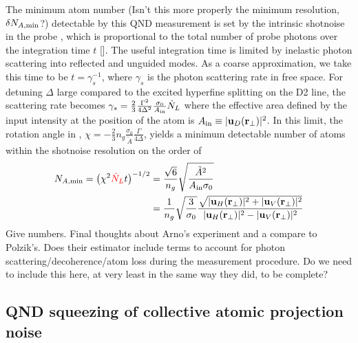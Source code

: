 \documentclass[preprint,aps,pra,onecolumn]{revtex4-1} %
\newcommand{\change}[1]{{\color{RoyalBlue} #1}}
\newcommand{\comment}[1]{{\color{Maroon} #1}}
\newcommand{\error}[1]{{\color{red} #1}}
\begin{document}
{The minimum atom number \comment{(Isn't this more properly the minimum resolution, $\delta N_{A,{\rm min}}$?)} detectable by this QND measurement is set by the intrinsic shotnoise in the probe \cite{smith_faraday_2003}, which is proportional to the total number of probe photons over the integration time $t$ [].  The useful integration time is limited by inelastic photon scattering into reflected and unguided modes. As a coarse approximation, we take this time to be $t=\gamma_s^{-1}$, where $\gamma_s$ is the photon scattering rate in free space.  For detuning $\Delta$ large compared to the excited hyperfine splitting on the D2 line, the scattering rate becomes \error{$\gamma_s =  \frac{2}{3} \frac{\Gamma^2}{4 \Delta^2}\frac{\sigma_0 }{A_{\rm in}} \dot{N}_L $} \cite{deutsch_quantum_2010} where the effective area defined by the input intensity at the position of the atom is \error{$A_{\rm in} \equiv  |\mathbf{u}_{D}(\mathbf{r}_\perp)|^2$}.  In this limit, the rotation angle in , $\chi = - \frac{2}{3} n_g  \frac{\sigma_0}{\tilde{A}}\frac{\Gamma}{4\Delta}$, yields a minimum detectable number of atoms within the shotnoise resolution on the order of
	\begin{align}
		N_{A, {\rm min}} = \big( \chi^2 \error{\dot{N}_L} t \big)^{-1/2}  &= \frac{\sqrt{6}}{n_g} \sqrt {\frac{\tilde{A}^2}{A_{\rm in} \sigma_0}}  \\ 
		&= \frac{1}{n_g} \sqrt{\frac{3}{\sigma_0 } } \frac{ \sqrt {|\mbf{u}_H(\mbf{r}_\perp)|^2 + |\mbf{u}_V(\mbf{r}_\perp)|^2} }{|\mbf{u}_H(\mbf{r}_\perp)|^2 - |\mbf{u}_V(\mbf{r}_\perp)|^2 }  
	\end{align}
}
{\color{red}  Give numbers}. \comment{Final thoughts about Arno's experiment and a compare to Polzik's.  Does their estimator include terms to account for photon scattering/decoherence/atom loss during the measurement procedure.  Do we need to include this here, at very least in the same way they did, to be complete?}

\change{
\subsection{QND squeezing of collective atomic projection noise}
}
\end{document}
